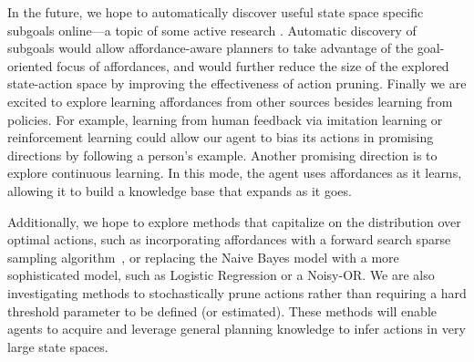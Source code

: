 \documentclass[letterpaper]{article}
\begin{document}
In the future, we hope to automatically discover useful state space
specific subgoals online---a topic of some active research
\cite{Mcgovern01automaticdiscovery,Simsek:2005:IUS:1102351.1102454}.
Automatic discovery of subgoals would allow affordance-aware planners
to take advantage of the goal-oriented focus of affordances, and would
further reduce the size of the explored state-action space by
improving the effectiveness of action pruning. Finally we are excited
to explore learning affordances from other sources besides learning
from policies.  For example, learning from human feedback via
imitation learning or reinforcement learning could allow our agent to
bias its actions in promising directions by following a person's
example.  Another promising direction is to explore continuous
learning.  In this mode, the agent uses affordances as it learns,
allowing it to build a knowledge base that expands as it goes.

Additionally, we hope to explore methods that capitalize on
the distribution over optimal actions, such as incorporating
affordances with a forward search sparse sampling
algorithm~\cite{walsh2010integrating}, or replacing the Naive Bayes
model with a more sophisticated model, such as Logistic Regression or
a Noisy-OR.  We are also investigating methods to stochastically prune
actions rather than requiring a hard threshold parameter to be defined
(or estimated).  These methods will enable agents to acquire and
leverage general planning knowledge to infer actions in very large
state spaces.



{\small


}
\end{document}
